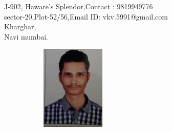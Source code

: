 \documentclass[a4paper]{article}
\begin{document}


\begin{flushleft}
{J-902, Haware's Splendor,\hfill{Contact : 9819949776} \\sector-20,Plot-52/56,\hfill{Email ID: vkv.5991@gmail.com}\\ Kharghar, \\Navi mumbai.}
\end{flushleft}


\begin{figure}[h]
\begin{flushright}
\graphicspath{ {images/} }
\includegraphics[width=5cm, height=4cm, angle = 270]{cv_pic}
\end{flushright}
\end{figure}
\end{document}
